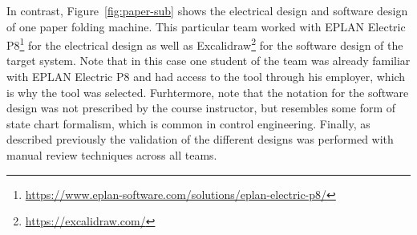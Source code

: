 \documentclass{PDS}
\begin{document}
In contrast, Figure~\ref{fig:paper-sub} shows the electrical design and software design of one paper folding machine.
This particular team worked with EPLAN Electric P8\footnote{\url{https://www.eplan-software.com/solutions/eplan-electric-p8/}} for the electrical design as well as Excalidraw\footnote{\url{https://excalidraw.com/}} for the software design of the target system.
Note that in this case one student of the team was already familiar with EPLAN Electric P8 and had access to the tool through his employer, which is why the tool was selected.
Furhtermore, note that the notation for the software design was not prescribed by the course instructor, but resembles some form of state chart formalism, which is common in control engineering.
Finally, as described previously the validation of the different designs was performed with manual review techniques across all teams.
\end{document}
